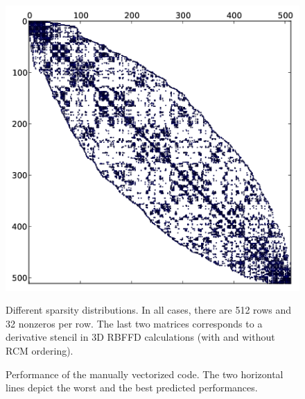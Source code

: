 \documentclass{sig-alternate}
\begin{document}
\begin{figure}[b]
\begin{center}
{      \includegraphics[width=\ww]{figures/kd-tree-3d-rcm-crop.png}}%
  \end{center}
  
  \caption{Different sparsity distributions. In all cases, there are
    512 rows and 32 nonzeros per row. The last two matrices
    corresponds to a derivative stencil in 3D RBFFD
    calculations (with and without RCM ordering).}
  \label{fig:spy_plots}
\end{figure}

\begin{figure}
  \centering
  
  \caption{Performance of the manually vectorized code. The two
    horizontal lines depict the worst and the best predicted performances.}
  \label{fig:expe_types}
\end{figure}
\end{document}
